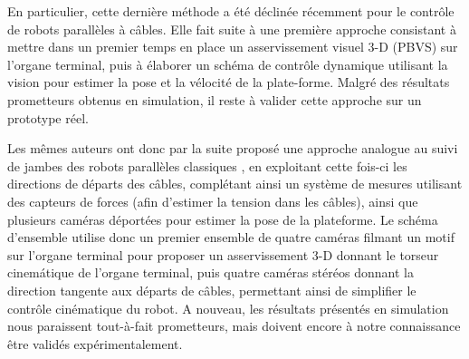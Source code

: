 En particulier, cette derni\`ere m\'ethode a \'et\'e d\'eclin\'ee r\'ecemment
pour le contr\^ole de robots parall\`eles \`a c\^ables. Elle fait suite \`a
une premi\`ere approche \cite{conf/iros/DallejGAMM11} consistant \`a mettre dans
un premier temps en place un asservissement visuel 3-D (PBVS) sur l'organe
terminal, puis \`a \'elaborer un sch\'ema de contr\^ole dynamique utilisant la
vision pour estimer la pose et la v\'elocit\'e de la plate-forme. Malgr\'e des
r\'esultats prometteurs obtenus en simulation, il reste \`a valider cette
approche sur un prototype r\'eel.

Les m\^emes auteurs ont donc par la suite propos\'e une approche analogue au
suivi de jambes des robots parall\`eles classiques \cite{dallej2012}, en
exploitant cette fois-ci les directions de d\'eparts des c\^ables, compl\'etant
ainsi un syst\`eme de mesures utilisant des capteurs de forces (afin d'estimer
la tension dans les c\^ables), ainsi que plusieurs cam\'eras d\'eport\'ees pour
estimer la pose de la plateforme. Le sch\'ema d'ensemble utilise donc un premier
ensemble de quatre cam\'eras filmant un motif sur l'organe terminal pour
proposer un asservissement 3-D donnant le torseur cinem\'atique de l'organe
terminal, puis quatre cam\'eras st\'er\'eos donnant la direction tangente aux
d\'eparts de c\^ables, permettant ainsi de simplifier le contr\^ole
cin\'ematique du robot. A nouveau, les r\'esultats pr\'esent\'es en simulation
nous paraissent tout-\`a-fait prometteurs, mais doivent encore \`a notre
connaissance \^etre valid\'es exp\'erimentalement.

